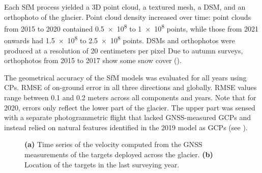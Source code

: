 Each SfM process yielded a 3D point cloud, a textured mesh, a DSM, and an orthophoto of the glacier. 
Point cloud density increased over time: point clouds from 2015 to 2020 contained \SI{0.5e8}{} to \SI{1e8}{} 
points, while those from 2021 onwards had \SI{1.5e8}{} to \SI{2.5e8}{} points. 
DSMs and orthophotos were produced at a resolution of 20 centimeters per pixel 
Due to autumn surveys, orthophotos from 2015 to 2017 show some snow cover ().

The geometrical accuracy of the SfM models was evaluated for all years using CPs.
 RMSE of on-ground error in all three directions and globally. 
RMSE values range between 0.1 and 0.2 meters across all components and years. 
Note that for 2020, errors only reflect the lower part of the glacier. 
The upper part was sensed with a separate photogrammetric flight that lacked GNSS-measured
GCPs and instead relied on natural features identified in the 2019 model as GCPs (see ).


\begin{figure}[ht!]
    \caption{\textbf{(a)} Time series of the velocity computed from the GNSS measurements of the targets deployed across the glacier. 
    \textbf{(b)} Location of the targets in the last surveying year.}
    \label{fig:3:GNSS_velocity}		
\end{figure}

